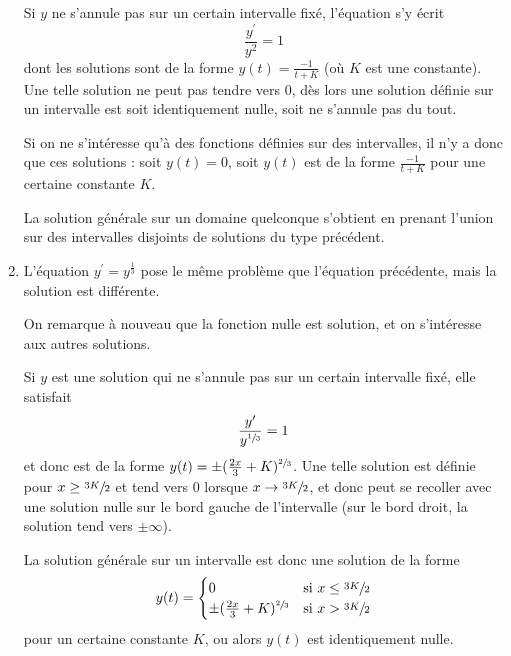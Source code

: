 \begin{enumerate}
Si $y$ ne s'annule pas sur un certain intervalle fixé, l'équation
s'y écrit
\begin{equation*}
\frac{y^\prime}{y^2} = 1
\end{equation*}
dont les solutions sont de la forme $y(t) = \frac{-1}{t + K}$ (où
$K$ est une constante). Une telle solution ne peut pas tendre vers
$0$, dès lors une solution définie sur un intervalle est soit
identiquement nulle, soit ne s'annule pas du tout.

Si on ne s'intéresse qu'à des fonctions définies sur des
intervalles, il n'y a donc que ces solutions : soit $y(t) = 0$, soit
$y(t)$ est de la forme $\frac{-1}{t + K}$ pour une certaine
constante $K$.

La solution générale sur un domaine quelconque s'obtient en prenant
l'union sur des intervalles disjoints de solutions du type
précédent.

\item L'équation $y^\prime = y^{\frac13}$ pose le même problème que
l'équation précédente, mais la solution est différente.

On remarque à nouveau que la fonction nulle est solution, et on
s'intéresse aux autres solutions.

Si $y$ est une solution qui ne s'annule pas sur un certain
intervalle fixé, elle satisfait
\begin{equation*}
\frac{y^\prime}{y^{\sfrac13}} = 1
\end{equation*}
et donc est de la forme $y(t) = \pm (\frac{2x}{3} +
K)^{\sfrac23}$. Une telle solution est définie pour $x \geq
\sfrac{3K}2$ et tend vers $0$ lorsque $x \to \sfrac{3K}2$, et donc
peut se recoller avec une solution nulle \og sur le bord gauche de
l'intervalle\fg{} (sur le bord droit, la solution tend vers $\pm
\infty$).

La solution générale sur un intervalle est donc une solution de la
forme
\begin{equation*}
y(t) =
\begin{cases}
0& \text{si }x \leq \sfrac{3K}2\\
\pm (\frac{2x}{3} + K)^{\sfrac23}& \text{si }x > \sfrac{3K}2
\end{cases}
\end{equation*}
pour un certaine constante $K$, ou alors $y(t)$ est identiquement
nulle.


\end{enumerate}
